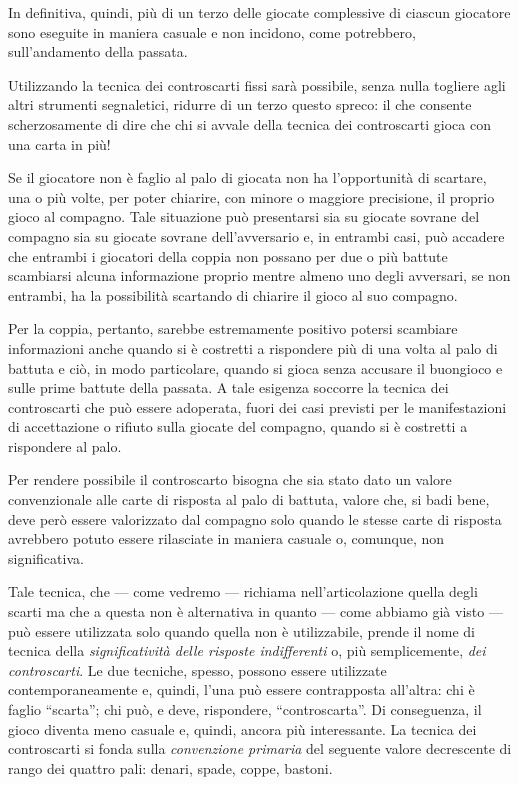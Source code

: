 \documentclass[italian,a4paper]{article}
\begin{document}
In definitiva, quindi, più di un terzo delle giocate complessive di ciascun giocatore sono eseguite in maniera casuale e non incidono, come potrebbero, sull'andamento della passata.

Utilizzando la tecnica dei controscarti fissi sarà possibile, senza nulla togliere agli altri strumenti segnaletici, ridurre di un terzo questo spreco:  il che consente scherzosamente di dire che chi si avvale della tecnica dei controscarti gioca con una carta in più!
 
Se il giocatore non è faglio al palo di giocata non ha l'opportunità di scartare, una o più volte, per poter chiarire, con minore o maggiore precisione, il proprio gioco al compagno. Tale situazione può presentarsi sia su giocate sovrane del compagno sia su giocate sovrane dell'avversario e, in entrambi casi, può accadere che entrambi i giocatori della coppia non possano per due o più battute scambiarsi alcuna informazione proprio mentre almeno uno degli avversari, se non entrambi, ha la possibilità scartando di chiarire il gioco al suo compagno.

Per la coppia, pertanto, sarebbe estremamente positivo potersi scambiare informazioni anche quando si è costretti a rispondere più di una volta al palo di battuta e ciò, in modo particolare, quando si gioca senza accusare il buongioco e sulle prime battute della passata.
A tale esigenza soccorre la tecnica dei controscarti che può essere adoperata, fuori dei casi previsti per le manifestazioni di accettazione o rifiuto sulla giocate del compagno, quando si è costretti a rispondere al palo.

Per rendere possibile il controscarto bisogna che sia stato dato un valore convenzionale alle carte di risposta al palo di battuta, valore che, si badi bene, deve però essere valorizzato dal compagno solo quando le stesse carte di risposta avrebbero potuto essere rilasciate in maniera casuale o, comunque, non significativa.

 Tale tecnica, che --- come vedremo --- richiama nell'articolazione
 quella degli scarti ma che a questa non è alternativa in quanto --- come
 abbiamo già visto --- può essere utilizzata solo quando quella non è
 utilizzabile, prende il nome di tecnica della \emph{significatività delle
 risposte indifferenti} o, più semplicemente, \emph{dei controscarti}.
Le due tecniche, spesso, possono essere utilizzate contemporaneamente e, quindi, l'una può essere contrapposta all'altra: chi è faglio ``scarta''; chi può, e deve, rispondere, ``controscarta''. Di conseguenza, il gioco diventa meno casuale e, quindi, ancora più interessante.
La tecnica dei controscarti si fonda sulla \emph{convenzione primaria} del seguente valore decrescente di rango dei quattro pali: denari, spade, coppe, bastoni.
\end{document}
